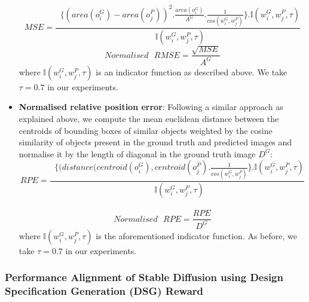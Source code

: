 \begin{itemize}
    \begin{equation}
        MSE = \frac{\mathop{\sum_{i=1}^{|O^G|}\sum_{j=1}^{|O^P|}} \{(area(o_i^G) - area(o_j^P))^2.\frac{area(o_i^G)}{A^G}.\frac{1}{cos(w_i^G, w_j^P)}\}.\mathbb{I}(w_i^G, w_j^P, \tau)}{\mathop{\sum_{i=1}^{|O^G|}\sum_{j=1}^{|O^P|}} \mathbb{I}(w_i^G, w_j^P, \tau) }
    \end{equation}
    \begin{equation}
        Normalised \text{ } RMSE = \frac{\sqrt{MSE}}{A^G}
    \end{equation}
    where $\mathbb{I}(w_i^G, w_j^P, \tau)$ is an indicator function as described above. We take $\tau = 0.7$ in our experiments.
    
    \item \textbf{Normalised relative position error}: Following a similar approach as explained above, we compute the mean euclidean distance between the centroids of bounding boxes of similar objects weighted by the cosine similarity of objects present in the ground truth and predicted images and normalise it by the length of diagonal in the ground truth image $D^G$:
    \begin{equation}
        RPE = \frac{\mathop{\sum_{i=1}^{|O^G|}\sum_{j=1}^{|O^P|}} \{(distance(centroid(o_i^G), centroid(o_j^P).\frac{1}{cos(w_i^G, w_j^P)}\}.\mathbb{I}(w_i^G, w_j^P, \tau)}{\mathop{\sum_{i=1}^{|O^G|}\sum_{j=1}^{|O^P|}} \mathbb{I}(w_i^G, w_j^P, \tau) }
    \end{equation}\
    \begin{equation}
        Normalised \text{ } RPE = \frac{RPE}{D^G}
    \end{equation}
    where $\mathbb{I}(w_i^G, w_j^P, \tau)$ is the aforementioned indicator function. As before, we take $\tau = 0.7$ in our experiments.
    
\end{itemize}



 



\subsubsection{Performance Alignment of Stable Diffusion using Design Specification Generation (DSG) Reward}
\label{sec: Performance Aligning Stable Diffusion - Content Simulation}

